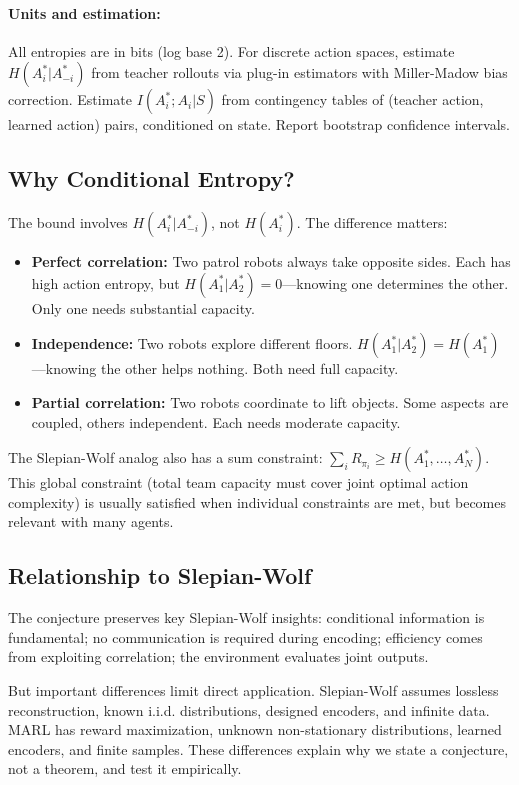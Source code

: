\documentclass[10pt, letterpaper]{article}
\begin{document}
\paragraph{Units and estimation:} All entropies are in bits (log base 2). For discrete action spaces, estimate $H(A_i^*|A_{-i}^*)$ from teacher rollouts via plug-in estimators with Miller-Madow bias correction. Estimate $I(A_i^*; A_i|S)$ from contingency tables of (teacher action, learned action) pairs, conditioned on state. Report bootstrap confidence intervals.

\subsection{Why Conditional Entropy?}

The bound involves $H(A_i^*|A_{-i}^*)$, not $H(A_i^*)$. The difference matters:
\begin{itemize}
    \item \textbf{Perfect correlation:} Two patrol robots always take opposite sides. Each has high action entropy, but $H(A_1^*|A_2^*) = 0$---knowing one determines the other. Only one needs substantial capacity.
    \item \textbf{Independence:} Two robots explore different floors. $H(A_1^*|A_2^*) = H(A_1^*)$---knowing the other helps nothing. Both need full capacity.
    \item \textbf{Partial correlation:} Two robots coordinate to lift objects. Some aspects are coupled, others independent. Each needs moderate capacity.
\end{itemize}
The Slepian-Wolf analog also has a sum constraint: $\sum_i R_{\pi_i} \geq H(A_1^*, \ldots, A_N^*)$. This global constraint (total team capacity must cover joint optimal action complexity) is usually satisfied when individual constraints are met, but becomes relevant with many agents.

\subsection{Relationship to Slepian-Wolf}

The conjecture preserves key Slepian-Wolf insights: conditional information is fundamental; no communication is required during encoding; efficiency comes from exploiting correlation; the environment evaluates joint outputs.

But important differences limit direct application. Slepian-Wolf assumes lossless reconstruction, known i.i.d. distributions, designed encoders, and infinite data. MARL has reward maximization, unknown non-stationary distributions, learned encoders, and finite samples. These differences explain why we state a conjecture, not a theorem, and test it empirically.
\end{document}

